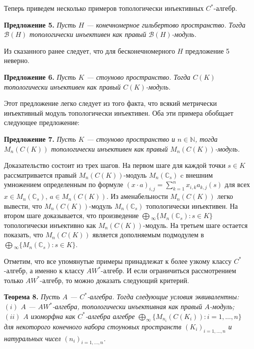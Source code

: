 \documentclass[12pt]{article}
\begin{document}
Теперь приведем несколько примеров топологически инъективных $C^*$-алгебр.

\medskip
\textbf{Предложение 5.} \textit{Пусть $H$ --- конечномерное гильбертово
пространство. Тогда $\mathcal{B}(H)$ топологически инъективен как правый
$\mathcal{B}(H)$-модуль.}

\medskip
Из сказанного ранее следует, что для бесконечномерного $H$ предложение 5
неверно.

\medskip
\textbf{Предложение 6.} \textit{Пусть $K$ --- стоуново пространство. Тогда
$C(K)$ топологически инъективен как правый $C(K)$-модуль.}

\medskip
Этот предложение легко следует из того факта, что всякий метрически инъективный
модуль топологически инъективен. Оба эти примера обобщает следующее предложение:

\medskip
\textbf{Предложение 7.} \textit{Пусть $K$ --- стоуново пространство и
$n\in\mathbb{N}$, тогда $M_n(C(K))$ топологически инъективен как правый
$M_n(C(K))$-модуль.}

\medskip
Доказательство состоит из трех шагов. На первом шаге для каждой точки $s\in K$
рассматривается правый $M_n(C(K))$-модуль $M_n(\mathbb{C}_s)$ c внешним
умножением определенным по формуле ${(x\cdot a)}_{i,j}=\sum_{k=1}^n
x_{i,k}a_{k,j}(s)$ для всех $x\in M_n(\mathbb{C}_s)$, $a\in M_n(C(K))$. Из
аменабельности $M_n(C(K))$ легко вывести, что $M_n(C(K))$-модуль
$M_n(\mathbb{C}_s)$ топологически инъективен. На втором шаге доказывается, что
произведение $\bigoplus{}_\infty \{M_n(\mathbb{C}_s):s\in K \}$ топологически
инъективно как $M_n(C(K))$-модуль. На третьем шаге остается показать, что
$M_n(C(K))$ является дополняемым подмодулем в $\bigoplus{}_\infty
\{M_n(\mathbb{C}_s):s\in K \}$.

Отметим, что все упомянутые примеры принадлежат к более узкому классу
$C^*$-алгебр, а именно к классу $AW^*$-алгебр. И если ограничиться рассмотрением
только $AW^*$-алгебр, то можно доказать следующий критерий.

\medskip
\textbf{Теорема 8.} \textit{Пусть $A$ --- $C^*$-алгебра. Тогда следующие условия
эквивалентны:
\newline
$(i)$ $A$ --- $AW^*$-алгебра, топологически инъективная как правый $A$-модуль;
\newline
$(ii)$ $A$ изоморфна как $C^*$-алгебра алгебре $\bigoplus_\infty
\{M_{n_i}(C(K_i)):i=1,\ldots,n \}$ для некоторого конечного набора стоуновых
пространств ${(K_i)}_{i=1,\ldots,n}$ и натуральных чисел
${(n_i)}_{i=1,\ldots,n}$.}
\end{document}
